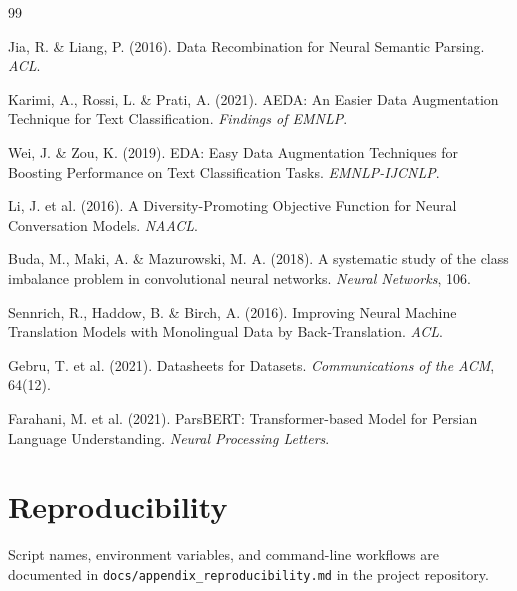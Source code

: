 \documentclass[11pt,a4paper]{article}
\begin{document}
\begin{thebibliography}{99}

Jia, R. \& Liang, P. (2016). Data Recombination for Neural Semantic Parsing. \textit{ACL}.

Karimi, A., Rossi, L. \& Prati, A. (2021). AEDA: An Easier Data Augmentation Technique for Text Classification. \textit{Findings of EMNLP}.

Wei, J. \& Zou, K. (2019). EDA: Easy Data Augmentation Techniques for Boosting Performance on Text Classification Tasks. \textit{EMNLP-IJCNLP}.

Li, J. et al. (2016). A Diversity-Promoting Objective Function for Neural Conversation Models. \textit{NAACL}.

Buda, M., Maki, A. \& Mazurowski, M. A. (2018). A systematic study of the class imbalance problem in convolutional neural networks. \textit{Neural Networks}, 106.

Sennrich, R., Haddow, B. \& Birch, A. (2016). Improving Neural Machine Translation Models with Monolingual Data by Back-Translation. \textit{ACL}.

Gebru, T. et al. (2021). Datasheets for Datasets. \textit{Communications of the ACM}, 64(12).

Farahani, M. et al. (2021). ParsBERT: Transformer-based Model for Persian Language Understanding. \textit{Neural Processing Letters}.

\end{thebibliography}

\appendix
\section{Reproducibility}
\label{sec:appendix}

Script names, environment variables, and command-line workflows are documented in \texttt{docs/appendix\_reproducibility.md} in the project repository.
\end{document}
